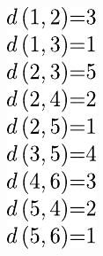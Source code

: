 \begin{figure}[!htbp]
\begin{subfigure}[b]{0.136\textwidth}
		\includegraphics[width=\textwidth]{Chapter_I/FORWARD-REVERSE-STAR-Example/c.pdf}

\end{subfigure}
\end{figure}
